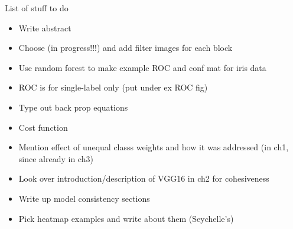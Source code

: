 
List of stuff to do

\begin{itemize}
\item Write abstract
\item Choose (in progress!!!) and add filter images for each block
\item Use random forest to make example ROC and conf mat for iris data
\item ROC is for single-label only (put under ex ROC fig)
\item Type out back prop equations
\item Cost function
\item Mention effect of unequal classs weights and how it was addressed (in ch1, since already in ch3)
\item Look over introduction/description of VGG16 in ch2 for cohesiveness
\item Write up model consistency sections
\item Pick heatmap examples and write about them (Seychelle's)
\end{itemize}
